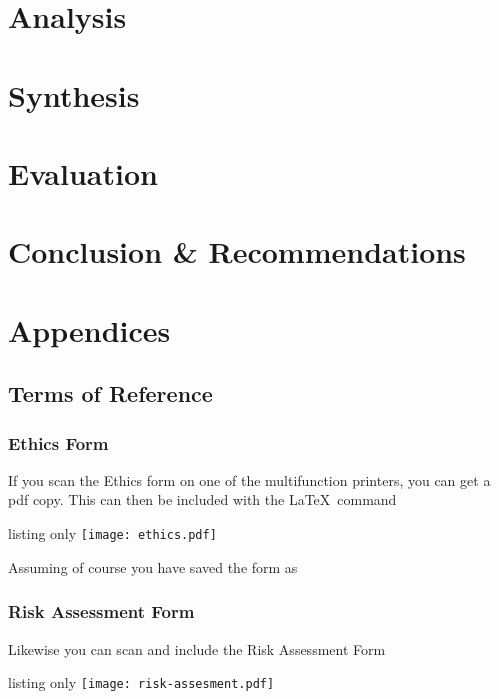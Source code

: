 \documentclass[12pt,twoside]{book}
\begin{document}
\frontmatter




\tableofcontents

\mainmatter


\part{Analysis}


\part{Synthesis}


\part{Evaluation}


\part{Conclusion \& Recommendations}






\part{Appendices}
\appendix

\chapter{Terms of Reference}
\label{appendix:tor}

\section{Ethics Form}
If you scan the Ethics form on one of the multifunction printers, you can get a pdf copy.  This can then be included with the \LaTeX\ command
\begin{tcblisting}{listing only}
\texttt{[image: ethics.pdf]}
\end{tcblisting}
Assuming of course you have saved the form  as 

\section{Risk Assessment Form}
Likewise you can scan and include the Risk Assessment Form
\begin{tcblisting}{listing only}
\texttt{[image: risk-assesment.pdf]}
\end{tcblisting}
\end{document}
